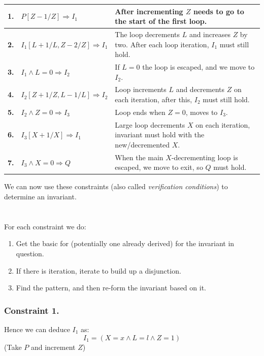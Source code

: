 \begin{center}
    \begin{tabular}{l l p{}}
        \textbf{1.} & $P[Z-1/Z] \Rightarrow I_1$              & After incrementing $Z$ needs to go to the start of the first loop.                                  \\
        \hline
        \textbf{2.} & $I_1[L + 1/L, Z - 2/Z] \Rightarrow I_1$ & The loop decrements $L$ and increases $Z$ by two. After each loop iteration, $I_1$ must still hold. \\
        \hline
        \textbf{3.} & $I_1 \land L = 0 \Rightarrow I_2$       & If $L = 0$ the loop is escaped, and we move to $I_2$.                                               \\
        \hline
        \textbf{4.} & $I_2[Z+1/Z,L-1/L] \Rightarrow I_2$      & Loop increments $L$ and decrements $Z$ on each iteration, after this, $I_2$ must still hold.        \\
        \hline
        \textbf{5.} & $I_2 \land Z = 0 \Rightarrow I_3$       & Loop ends when $Z = 0$, moves to $I_3$.                                                             \\
        \hline
        \textbf{6.} & $I_3[X+1/X] \Rightarrow I_1$            & Large loop decrements $X$ on each iteration, invariant must hold with the new/decremented $X$.      \\
        \hline
        \textbf{7.} & $I_3 \land X = 0 \Rightarrow Q$         & When the main $X$-decrementing loop is escaped, we move to exit, so $Q$ must hold.
    \end{tabular}
\end{center}
We can now use these constraints (also called \textit{verification conditions}) to determine an invariant.
\\
\\
\\ For each constraint we do:
\begin{enumerate}
    \item Get the basic for (potentially one already derived) for the invariant in question.
    \item If there is iteration, iterate to build up a disjunction.
    \item Find the pattern, and then re-form the invariant based on it.
\end{enumerate}

\subsubsection*{Constraint 1.}
Hence we can deduce $I_1$ as:
\[I_1 = (X = x \land L = l \land Z = 1)\]
(Take $P$ and increment $Z$)

